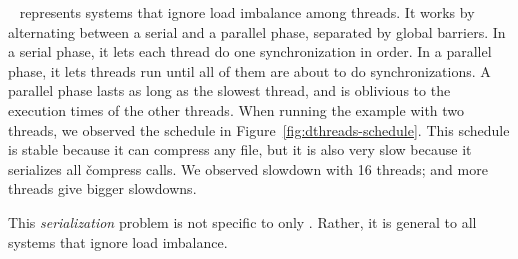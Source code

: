 \dthreads~\cite{dthreads:sosp11} represents \smt systems that
ignore load imbalance among threads.  It works by
alternating between a serial and a parallel phase, separated by global
barriers.  In a serial phase, it lets each thread do one synchronization in
order.  In a parallel phase, it lets threads run until all of them are about
to do synchronizations.  A parallel phase lasts as long as the slowest
thread, and is oblivious to the execution times of the other threads.  When
running the example with two threads, we observed the \dthreads schedule
in Figure~\ref{fig:dthreads-schedule}.  This schedule is stable because it
can compress any file, but it is also very slow because it serializes all
\v{compress} calls.  We observed \dthreadsexampleoverhead slowdown
with 16 threads; and more threads give bigger slowdowns.

This \emph{serialization} problem is not specific to only
\dthreads. Rather, it is general to all \smt systems that ignore load
imbalance.






